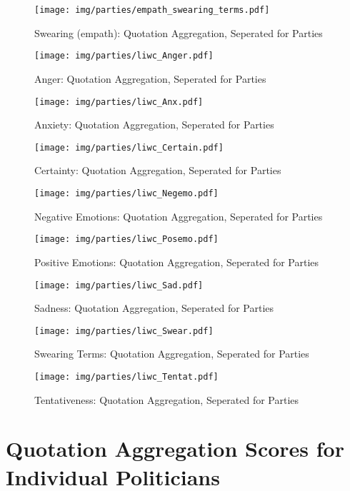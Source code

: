 \begin{figure}[h]\centering
\texttt{[image: img/parties/empath\_swearing\_terms.pdf]}
\caption{Swearing (empath): Quotation Aggregation, Seperated for Parties}
\label{fig: parties_Swearing (empath)}
\end{figure}

\begin{figure}[h]\centering
\texttt{[image: img/parties/liwc\_Anger.pdf]}
\caption{Anger: Quotation Aggregation, Seperated for Parties}
\label{fig: parties_Anger}
\end{figure}

\begin{figure}[h]\centering
\texttt{[image: img/parties/liwc\_Anx.pdf]}
\caption{Anxiety: Quotation Aggregation, Seperated for Parties}
\label{fig: parties_Anxiety}
\end{figure}

\begin{figure}[h]\centering
\texttt{[image: img/parties/liwc\_Certain.pdf]}
\caption{Certainty: Quotation Aggregation, Seperated for Parties}
\label{fig: parties_Certainty}
\end{figure}

\begin{figure}[h]\centering
\texttt{[image: img/parties/liwc\_Negemo.pdf]}
\caption{Negative Emotions: Quotation Aggregation, Seperated for Parties}
\label{fig: parties_Negative Emotions}
\end{figure}

\begin{figure}[h]\centering
\texttt{[image: img/parties/liwc\_Posemo.pdf]}
\caption{Positive Emotions: Quotation Aggregation, Seperated for Parties}
\label{fig: parties_Positive Emotions}
\end{figure}

\begin{figure}[h]\centering
\texttt{[image: img/parties/liwc\_Sad.pdf]}
\caption{Sadness: Quotation Aggregation, Seperated for Parties}
\label{fig: parties_Sadness}
\end{figure}

\begin{figure}[h]\centering
\texttt{[image: img/parties/liwc\_Swear.pdf]}
\caption{Swearing Terms: Quotation Aggregation, Seperated for Parties}
\label{fig: parties_Swearing Terms}
\end{figure}

\begin{figure}[h]\centering
\texttt{[image: img/parties/liwc\_Tentat.pdf]}
\caption{Tentativeness: Quotation Aggregation, Seperated for Parties}
\label{fig: parties_Tentativeness}
\end{figure}

\clearpage
\pagebreak

\section{Quotation Aggregation Scores for Individual Politicians}

\clearpage
\pagebreak

